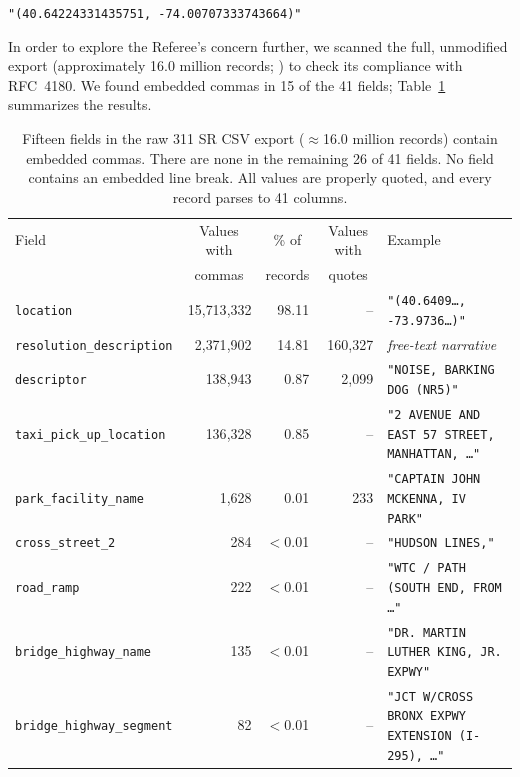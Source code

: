 \documentclass[11pt]{article}
\begin{document}
\begin{center}
\texttt{"(40.64224331435751, -74.00707333743664)"}
\end{center}


In order to explore the Referee's concern further, we scanned the full,
unmodified export (approximately 16.0 million records; \citealp{nyc311_data}) to 
check its compliance with RFC~4180. We found embedded commas in 
15 of the 41 fields; Table~\ref{tab:embedded-commas} summarizes the results.


\begin{table}[htbp]
\centering
\footnotesize
\caption{Fifteen fields in the raw 311 SR CSV export ($\approx$16.0 million records)
contain embedded commas. There are none in the remaining 26 of 41 fields. 
No field contains an embedded line break. All values
are properly quoted, and every record parses to 41 columns.}
\label{tab:embedded-commas}
\begin{tabularx}{\textwidth}{@{}lrrr>{\raggedright\arraybackslash}X@{}}
\toprule
Field & \multicolumn{1}{c}{Values with} & \multicolumn{1}{c}{\% of} & \multicolumn{1}{c}{Values with} & Example \\
      & \multicolumn{1}{c}{commas}      & \multicolumn{1}{c}{records} & \multicolumn{1}{c}{quotes} & \\
\midrule
\texttt{location} & 15{,}713{,}332 & 98.11 & -- & \texttt{"(40.6409\ldots{}, -73.9736\ldots{})"} \\
\texttt{resolution\_description} & 2{,}371{,}902 & 14.81 & 160{,}327 & \textit{free-text narrative} \\
\texttt{descriptor} & 138{,}943 & 0.87 & 2{,}099 & \texttt{"NOISE, BARKING DOG (NR5)"} \\
\texttt{taxi\_pick\_up\_location} & 136{,}328 & 0.85 & -- & \texttt{"2 AVENUE AND EAST 57 STREET, MANHATTAN, \ldots{}"} \\
\texttt{park\_facility\_name} & 1{,}628 & 0.01 & 233 & \texttt{"CAPTAIN JOHN MCKENNA, IV PARK"} \\
\texttt{cross\_street\_2} & 284 & $<$0.01 & -- & \texttt{"HUDSON LINES,"} \\
\texttt{road\_ramp} & 222 & $<$0.01 & -- & \texttt{"WTC / PATH (SOUTH END, FROM \ldots{}"} \\
\texttt{bridge\_highway\_name} & 135 & $<$0.01 & -- & \texttt{"DR. MARTIN LUTHER KING, JR. EXPWY"} \\
\texttt{bridge\_highway\_segment} & 82 & $<$0.01 & -- & \texttt{"JCT W/CROSS BRONX EXPWY EXTENSION (I-295), \ldots{}"} \\

\end{tabularx}
\end{table}
\end{document}
